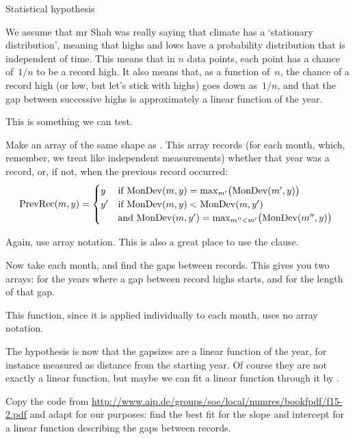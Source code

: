  {Statistical hypothesis}

We assume that mr Shah was really saying that climate has a
`stationary distribution', meaning that highs and lows have a
probability distribution that is independent of time.
This means that in $n$ data points, each point has a chance
of~$1/n$ to be a record high. It also means that, as a function
of~$n$, the chance of a record high (or low, but let's stick with
highs) goes down as~$1/n$, and that the gap between successive highs
is approximately a linear function of the year.

This is something we can test.

\begin{exercise}
  Make an array  of the same shape as
  . This array records (for each month, which,
  remember, we treat like independent measurements) whether
  that year was a record, or, if not, when the previous record
  occurred:
  \[ \mathrm{PrevRec}(m,y) = 
  \begin{cases}
    y&\hbox{if
      $\mathrm{MonDev}(m,y) = \max_{m'} \bigl( \mathrm{MonDev}(m',y)\bigr)$
    }\\
    y'&\hbox{if
      $\mathrm{MonDev}(m,y) < \mathrm{MonDev}(m,y')$ }\\
      &\hbox{and
      $\mathrm{MonDev}(m,y') = \max_{m''<m'}\bigl( \mathrm{MonDev}(m'',y)\bigr)$
    }\\
  \end{cases}
  \]

  Again, use array notation. This is also a great place to use the
   clause.
\end{exercise}

\begin{exercise}
  Now take each month, and find the gaps between records. This gives
  you two arrays:  for the years where a gap between
  record highs starts, and  for the length of that gap.

  This function, since it is applied individually to each month, uses
  no array notation.
\end{exercise}

The hypothesis is now that the gapsizes are a linear function of the
year, for instance measured as distance from the starting year. Of
course they are not exactly a linear function, but maybe we can fit a
linear function through it by .

\begin{exercise}
  Copy the code from
  \url{http://www.aip.de/groups/soe/local/numres/bookfpdf/f15-2.pdf} and
  adapt for our purposes: find the best fit for the slope and
  intercept for a linear function describing the gaps between records.
\end{exercise}

